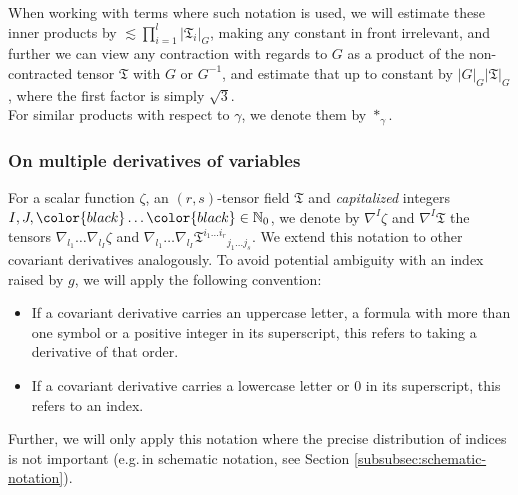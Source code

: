 \documentclass[11pt,leqno,textwidth=10cm]{amsart}
\numberwithin{equation}{section}
\theoremstyle{definition}
\theoremstyle{plain}
\newcommand{\1}{\mathbbm{1}}
\newcommand{\N}{\mathbb{N}}
\newcommand{\change}[1]{\color{black}#1\color{black}}
\begin{document}
When working with terms where such notation is used, we will estimate these inner products by $\lesssim \prod_{i=1}^l\lvert\mathfrak{T}_i\rvert_G$, making any constant in front irrelevant, and further we can view any contraction with regards to $G$ as a product of the non-contracted tensor $\mathfrak{T}$ with $G$ or $G^{-1}$, and estimate that up to constant by $\lvert G\rvert_G\lvert\mathfrak{T}\rvert_G$, where the first factor is simply $\sqrt{3}$.\\
For similar products with respect to $\gamma$, we denote them by $\ast_{\gamma}$.

\subsubsection{On multiple derivatives of variables}\label{subsubsec:notation-derivatives}

For a scalar function $\zeta$, an $(r,s)$-tensor field $\mathfrak{T}$ and \textit{capitalized} integers $I,J,\change{\ldots}\in\N_0$, we denote by $\nabla^I\zeta$ and $\nabla^I\mathfrak{T}$ the tensors $\nabla_{l_1}\dots\nabla_{l_I}\zeta$ and\linebreak
$\nabla_{l_1}\dots\nabla_{l_I}{\mathfrak{T}^{i_1\dots i_r}}_{j_1\dots j_s}$. We extend this notation to other covariant derivatives analogously. To avoid potential ambiguity with an index raised by \change{$g$}, we will apply the following convention:
\begin{itemize}
\item If a covariant derivative carries an uppercase letter, a formula with more than one symbol or a positive integer in its superscript, this refers to taking a derivative of that order.
\item If a covariant derivative carries a lowercase letter or $0$ in its superscript, this refers to an index.
\end{itemize}
Further, we will only apply this notation where the precise distribution of indices is not important (e.g.\,in schematic notation, see Section \ref{subsubsec:schematic-notation}).
\end{document}
